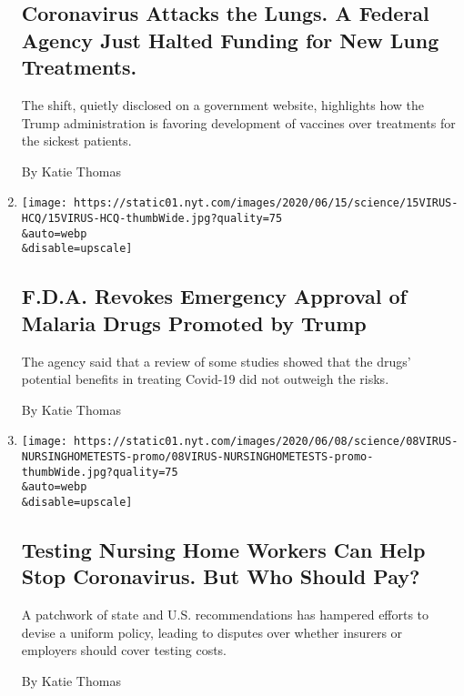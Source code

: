 \begin{enumerate}
{  \subsection{Coronavirus Attacks the Lungs. A Federal Agency Just
  Halted Funding for New Lung
  Treatments.}\label{coronavirus-attacks-the-lungs-a-federal-agency-just-halted-funding-for-new-lung-treatments}}

  The shift, quietly disclosed on a government website, highlights how
  the Trump administration is favoring development of vaccines over
  treatments for the sickest patients.

  By Katie Thomas
\item
  \href{/2020/06/15/health/fda-hydroxychloroquine-malaria.html}{}

  \texttt{[image: https://static01.nyt.com/images/2020/06/15/science/15VIRUS-HCQ/15VIRUS-HCQ-thumbWide.jpg?quality=75\\\&auto=webp\\\&disable=upscale]}

  \hypertarget{fda-revokes-emergency-approval-of-malaria-drugs-promoted-by-trump}{%
  \subsection{F.D.A. Revokes Emergency Approval of Malaria Drugs
  Promoted by
  Trump}\label{fda-revokes-emergency-approval-of-malaria-drugs-promoted-by-trump}}

  The agency said that a review of some studies showed that the drugs'
  potential benefits in treating Covid-19 did not outweigh the risks.

  By Katie Thomas
\item
  \href{/2020/06/09/health/testing-coronavirus-nursing-homes-workers.html}{}

  \texttt{[image: https://static01.nyt.com/images/2020/06/08/science/08VIRUS-NURSINGHOMETESTS-promo/08VIRUS-NURSINGHOMETESTS-promo-thumbWide.jpg?quality=75\\\&auto=webp\\\&disable=upscale]}

  \hypertarget{testing-nursing-home-workers-can-help-stop-coronavirus-but-who-should-pay}{%
  \subsection{Testing Nursing Home Workers Can Help Stop Coronavirus.
  But Who Should
  Pay?}\label{testing-nursing-home-workers-can-help-stop-coronavirus-but-who-should-pay}}

  A patchwork of state and U.S. recommendations has hampered efforts to
  devise a uniform policy, leading to disputes over whether insurers or
  employers should cover testing costs.

  By Katie Thomas
\end{enumerate}

